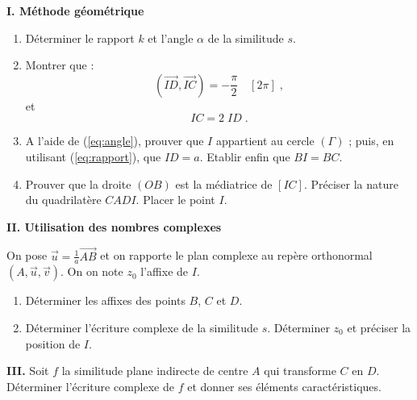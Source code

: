\begin{exo}
\begin{description}
                  \textbf{I. M\'ethode g\'eom\'etrique}
                  
                  \begin{enumerate}
                        \item D\'eterminer le rapport $k$ et l'angle $\alpha$ de la similitude $s$. 
                        \item Montrer que : 
                              \begin{equation} \label{eq:angle}
                                    (\overrightarrow{ID}, \overrightarrow{IC}) = -\frac{\pi}{2} \quad [2 \pi] \;,
                              \end{equation}
                              et
                              \begin{equation} \label{eq:rapport}
                                    IC = 2 \; ID \;.
                              \end{equation}
                        \item A l'aide de (\ref{eq:angle}), prouver que $I$ appartient au cercle $(\Gamma)$ ; 
                              puis, en utilisant (\ref{eq:rapport}), que $ID = a$.
                              Etablir enfin que $BI = BC$.
                        \item Prouver que la droite $(OB)$ est la m\'ediatrice de $[IC]$.
                              Pr\'eciser la nature du quadrilat\`ere $CADI$. Placer le point $I$.
                  \end{enumerate}
                  
                  \textbf{II. Utilisation des nombres complexes}
                  
                  On pose $\vec{u} = \frac{1}{a} \overrightarrow{AB}$ et on rapporte le 
                  plan complexe au rep\`ere orthonormal $(A, \vec{u}, \vec{v})$.
                  On on note $z_0$ l'affixe de $I$.
                  \begin{enumerate}
                        \item D\'eterminer les affixes des points $B$, $C$ et $D$.
                        \item D\'eterminer l'\'ecriture complexe de la similitude $s$.
                              D\'eterminer $z_0$ et pr\'eciser la position de $I$.
                  \end{enumerate}
                  
                  \textbf{III.} 
                        Soit $f$ la similitude plane indirecte de centre $A$ qui transforme $C$ en $D$.       
                        D\'eterminer l'\'ecriture complexe de $f$ et donner ses \'el\'ements caract\'eristiques.
      \end{description}
\end{exo}




























